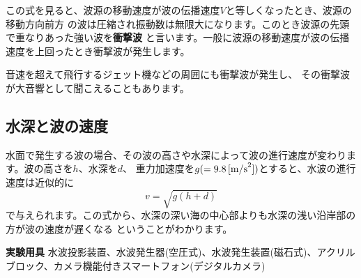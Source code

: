 この式を見ると、波源の移動速度が波の伝播速度$V$と等しくなったとき、波源の移動方向前方
の波は圧縮され振動数は無限大になります。このとき波源の先頭で重なりあった強い波を{\bf 衝撃波}
と言います。一般に波源の移動速度が波の伝播速度を上回ったとき衝撃波が発生します。

音速を超えて飛行するジェット機などの周囲にも衝撃波が発生し、
その衝撃波が大音響として聞こえることもあります。

\subsection{水深と波の速度}

水面で発生する波の場合、その波の高さや水深によって波の進行速度が変わります。波の高さを$h$、水深を$d$、
重力加速度を$g(=9.8\, [{\rm m/s}^2])$とすると、水波の進行速度は近似的に
\[
v = \sqrt{g(h+d)}
\]
で与えられます。この式から、水深の深い海の中心部よりも水深の浅い沿岸部の方が波の速度が遅くなる
ということがわかります。

\newpage

\jikken

\begin{itemsquarebox}[c]{\bf 実験用具}
水波投影装置、水波発生器(空圧式)、水波発生装置(磁石式)、アクリルブロック、カメラ機能付きスマートフォン(デジタルカメラ)
\end{itemsquarebox}

\bigskip


